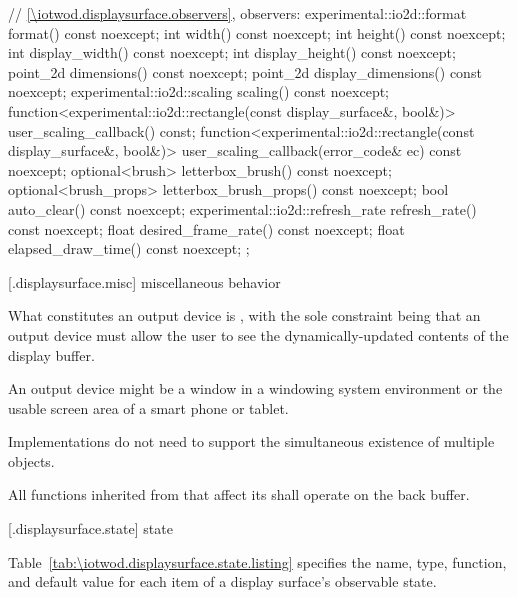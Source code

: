 \begin{codeblock}
{{    // \ref{\iotwod.displaysurface.observers}, observers:
    experimental::io2d::format format() const noexcept;
    int width() const noexcept;
    int height() const noexcept;
    int display_width() const noexcept;
    int display_height() const noexcept;
    point_2d dimensions() const noexcept;
    point_2d display_dimensions() const noexcept;
    experimental::io2d::scaling scaling() const noexcept;
    function<experimental::io2d::rectangle(const display_surface&,
      bool&)> user_scaling_callback() const;
    function<experimental::io2d::rectangle(const display_surface&,
      bool&)> user_scaling_callback(error_code& ec) const noexcept;
    optional<brush> letterbox_brush() const noexcept;
    optional<brush_props> letterbox_brush_props() const noexcept;
    bool auto_clear() const noexcept;
    experimental::io2d::refresh_rate refresh_rate() const noexcept;
    float desired_frame_rate() const noexcept;
    float elapsed_draw_time() const noexcept;
  };
}
\end{codeblock}

 [\iotwod.displaysurface.misc] { miscellaneous behavior}

\pnum
What constitutes an output device is , with the sole constraint being that an output device must allow the user to see the dynamically-updated contents of the display buffer.
\begin{example}
An output device might be a window in a windowing system environment or the usable screen area of a smart phone or tablet.
\end{example}

\pnum
Implementations do not need to support the simultaneous existence of multiple  objects.

\pnum
All functions inherited from  that affect its \underlyingsurface shall operate on the back buffer.

 [\iotwod.displaysurface.state] { state}

\pnum
Table~\ref{tab:\iotwod.displaysurface.state.listing} specifies the name, type, function, and default value for each item of a display surface's observable state.

